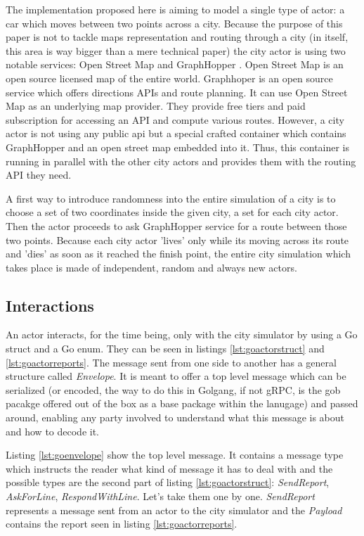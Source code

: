 \documentclass[conference]{IEEEtran}
\begin{document}
The implementation proposed here is aiming to model a single type of actor: a car which moves between two points across a city. Because the purpose of this paper is not to tackle maps representation and routing through a city (in itself, this area is way bigger than a mere technical paper) the city actor is using two notable services: Open Street Map \citep{openstreetmap} and GraphHopper \citep{graphhopper}. Open Street Map is an open source licensed map of the entire world. Graphhoper is an open source service which offers directions APIs and route planning. It can use Open Street Map as an underlying map provider. They provide free tiers and paid subscription for accessing an API and compute various routes. However, a city actor is not using any public api but a special crafted container which contains GraphHopper and an open street map embedded into it. Thus, this container is running in parallel with the other city actors and provides them with the routing API they need.

A first way to introduce randomness into the entire simulation of a city is to choose a set of two coordinates inside the given city, a set for each city actor. Then the actor proceeds to ask GraphHopper service for a route between those two points. Because each city actor 'lives' only while its moving across its route and 'dies' as soon as it reached the finish point, the entire city simulation which takes place is made of independent, random and always new actors.

\subsection{Interactions}

An actor interacts, for the time being, only with the city simulator by using a Go struct and a Go enum. They can be seen in listings \ref{lst:goactorstruct} and \ref{lst:goactorreports}. The message sent from one side to another has a general structure called \textit{Envelope}. It is meant to offer a top level message which can be serialized (or encoded, the way to do this in Golgang, if not gRPC, is the gob pacakge offered out of the box as a base package within the lanugage) and passed around, enabling any party involved to understand what this message is about and how to decode it.

Listing \ref{lst:goenvelope} show the top level message. It contains a message type which instructs the reader what kind of message it has to deal with and the possible types are the second part of listing \ref{lst:goactorstruct}: \textit{SendReport}, \textit{AskForLine}, \textit{RespondWithLine}. Let's take them one by one. \textit{SendReport} represents a message sent from an actor to the city simulator and the \textit{Payload} contains the report seen in listing \ref{lst:goactorreports}. 
\end{document}
